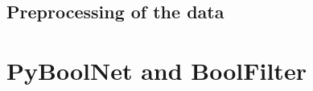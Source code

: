 \subsection*{Preprocessing of the data}
\citep{DISCRETIZATION}
\citep{10.1371/journal.pone.0066031}

\section{PyBoolNet and BoolFilter}


